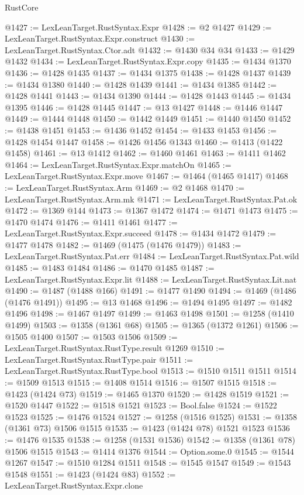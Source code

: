 \begin{lexlean}{RustCore}
\begin{coremodule}
{\begin{coremodule}
{{{{{{{{{{{{{{{{{{{{{{{{{{{{{{{{{{{{{{{{{{{{{{{@1427 := LexLeanTarget.RustSyntax.Expr
@1428 := @2 @1427
@1429 := LexLeanTarget.RustSyntax.Expr.construct
@1430 := LexLeanTarget.RustSyntax.Ctor.adt
@1432 := @1430 @34 @34
@1433 := @1429 @1432
@1434 := LexLeanTarget.RustSyntax.Expr.copy
@1435 := @1434 @1370
@1436 := @1428 @1435
@1437 := @1434 @1375
@1438 := @1428 @1437
@1439 := @1434 @1380
@1440 := @1428 @1439
@1441 := @1434 @1385
@1442 := @1428 @1441
@1443 := @1434 @1390
@1444 := @1428 @1443
@1445 := @1434 @1395
@1446 := @1428 @1445
@1447 := @13 @1427
@1448 := @1446 @1447
@1449 := @1444 @1448
@1450 := @1442 @1449
@1451 := @1440 @1450
@1452 := @1438 @1451
@1453 := @1436 @1452
@1454 := @1433 @1453
@1456 := @1428 @1454 @1447
@1458 := @1426 @1456 @1343
@1460 := @1413 (@1422 @1458)
@1461 := @13 @1412
@1462 := @1460 @1461
@1463 := @1411 @1462
@1464 := LexLeanTarget.RustSyntax.Expr.matchOn
@1465 := LexLeanTarget.RustSyntax.Expr.move
@1467 := @1464 (@1465 @1417)
@1468 := LexLeanTarget.RustSyntax.Arm
@1469 := @2 @1468
@1470 := LexLeanTarget.RustSyntax.Arm.mk
@1471 := LexLeanTarget.RustSyntax.Pat.ok
@1472 := @1369 @144
@1473 := @1367 @1472
@1474 := @1471 @1473
@1475 := @1470 @1474
@1476 := @1411 @1461
@1477 := LexLeanTarget.RustSyntax.Expr.succeed
@1478 := @1434 @1472
@1479 := @1477 @1478
@1482 := @1469 (@1475 (@1476 @1479))
@1483 := LexLeanTarget.RustSyntax.Pat.err
@1484 := LexLeanTarget.RustSyntax.Pat.wild
@1485 := @1483 @1484
@1486 := @1470 @1485
@1487 := LexLeanTarget.RustSyntax.Expr.lit
@1488 := LexLeanTarget.RustSyntax.Lit.nat
@1490 := @1487 (@1488 @166)
@1491 := @1477 @1490
@1494 := @1469 (@1486 (@1476 @1491))
@1495 := @13 @1468
@1496 := @1494 @1495
@1497 := @1482 @1496
@1498 := @1467 @1497
@1499 := @1463 @1498
@1501 := @1258 (@1410 @1499)
@1503 := @1358 (@1361 @68)
@1505 := @1365 (@1372 @1261)
@1506 := @1505 @1400
@1507 := @1503 @1506
@1509 := LexLeanTarget.RustSyntax.RustType.result @1269
@1510 := LexLeanTarget.RustSyntax.RustType.pair
@1511 := LexLeanTarget.RustSyntax.RustType.bool
@1513 := @1510 @1511 @1511
@1514 := @1509 @1513
@1515 := @1408 @1514
@1516 := @1507 @1515
@1518 := @1423 (@1424 @73)
@1519 := @1465 @1370
@1520 := @1428 @1519
@1521 := @1520 @1447
@1522 := @1518 @1521
@1523 := Bool.false
@1524 := @1522 @1523
@1525 := @1476 @1524
@1527 := @1258 (@1516 @1525)
@1531 := @1358 (@1361 @73) @1506 @1515
@1535 := @1423 (@1424 @78) @1521 @1523
@1536 := @1476 @1535
@1538 := @1258 (@1531 @1536)
@1542 := @1358 (@1361 @78) @1506 @1515
@1543 := @1414 @1376
@1544 := Option.some.{0}
@1545 := @1544 @1267
@1547 := @1510 @1284 @1511
@1548 := @1545 @1547
@1549 := @1543 @1548
@1551 := @1423 (@1424 @83)
@1552 := LexLeanTarget.RustSyntax.Expr.clone
}}}}}}}}}}}}}}}}}}}}}}}}}}}}}}}}}}}}}}}}}}}}}}}
\end{coremodule}}
\end{coremodule}
\end{lexlean}
